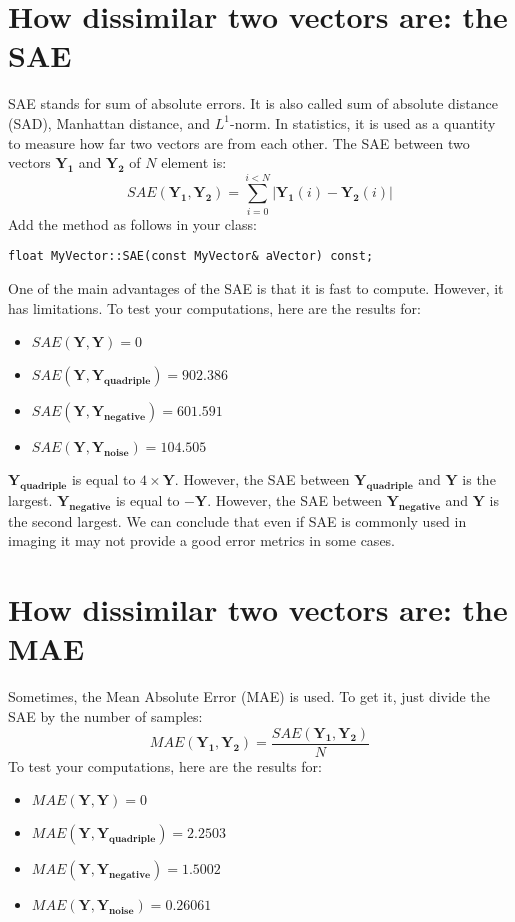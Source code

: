 \documentclass[english,a4paper,12pt,oneside]{article}
\begin{document}
\section{How dissimilar two vectors are: the SAE}

SAE stands for sum of absolute errors. It is also called sum of absolute distance (SAD), Manhattan distance, and $L^1$-norm.  
In statistics, it is used as a quantity to measure how far two vectors are from each other. 
The SAE between two vectors $\mathbf{Y_1}$ and $\mathbf{Y_2}$ of $N$ element is:
\begin{equation}
SAE(\mathbf{Y_1}, \mathbf{Y_2}) = \sum^{i < N}_{i=0} |\mathbf{Y_1}(i)-\mathbf{Y_2}(i)|
\end{equation}
Add the method as follows in your class:
\begin{lstlisting}
float MyVector::SAE(const MyVector& aVector) const;
\end{lstlisting}

One of the main advantages of the SAE is that it is fast to compute.  
However, it has limitations. 
To test your computations, here are the results for:
\begin{itemize}
\item $SAE(\mathbf{Y}, \mathbf{Y}) =  0$
\item $SAE(\mathbf{Y}, \mathbf{Y_{quadriple}}) =  902.386$
\item $SAE(\mathbf{Y}, \mathbf{Y_{negative}}) =  601.591$
\item $SAE(\mathbf{Y}, \mathbf{Y_{noise}}) =  104.505$
\end{itemize}
$\mathbf{Y_{quadriple}}$ is equal to $4 \times \mathbf{Y}$. 
However, the SAE between $\mathbf{Y_{quadriple}}$ and $\mathbf{Y}$ is the largest. 
$\mathbf{Y_{negative}}$ is equal to $\mathbf{-Y}$. 
However, the SAE between $\mathbf{Y_{negative}}$ and $\mathbf{Y}$ is the second largest. 
We can conclude that even if SAE is commonly used in imaging  it may not provide a good error metrics in some cases.

\section{How dissimilar two vectors are: the MAE}

Sometimes, the Mean Absolute Error (MAE) is used. To get it, just divide the SAE by the number of samples:
\begin{equation}
MAE(\mathbf{Y_1}, \mathbf{Y_2}) = \frac{SAE(\mathbf{Y_1}, \mathbf{Y_2})}{N}
\end{equation}
To test your computations, here are the results for:
\begin{itemize}
\item $MAE(\mathbf{Y}, \mathbf{Y}) =  0$
\item $MAE(\mathbf{Y}, \mathbf{Y_{quadriple}}) =  2.2503$
\item $MAE(\mathbf{Y}, \mathbf{Y_{negative}}) =  1.5002$
\item $MAE(\mathbf{Y}, \mathbf{Y_{noise}}) =  0.26061$
\end{itemize}
\end{document}

